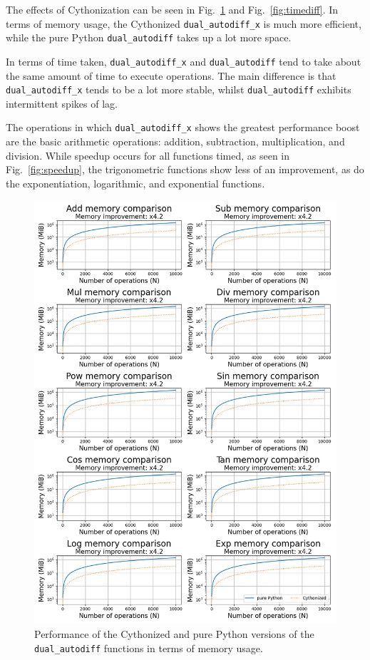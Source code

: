 \documentclass[11pt,a4paper]{article}
\begin{document}
The effects of Cythonization can be seen in Fig.~\ref{fig:memdiff} and Fig.~\ref{fig:timediff}. In terms of memory usage, the Cythonized \texttt{dual\_autodiff\_x} is much more efficient, while the pure Python \texttt{dual\_autodiff} takes up a lot more space.

In terms of time taken, \texttt{dual\_autodiff\_x} and \texttt{dual\_autodiff} tend to take about the same amount of time to execute operations. The main difference is that \texttt{dual\_autodiff\_x} tends to be a lot more stable, whilst \texttt{dual\_autodiff} exhibits intermittent spikes of lag.

The operations in which \texttt{dual\_autodiff\_x} shows the greatest performance boost are the basic arithmetic operations: addition, subtraction, multiplication, and division. While speedup occurs for all functions timed, as seen in Fig.~\ref{fig:speedup}, the trigonometric functions show less of an improvement, as do the exponentiation, logarithmic, and exponential functions.

\begin{figure}
    \centering
    \includegraphics[width=\columnwidth, keepaspectratio]{../memory.png}
    \caption{Performance of the Cythonized and pure Python versions of the \texttt{dual\_autodiff} functions in terms of memory usage.}
    \label{fig:memdiff}
\end{figure}
\end{document}
